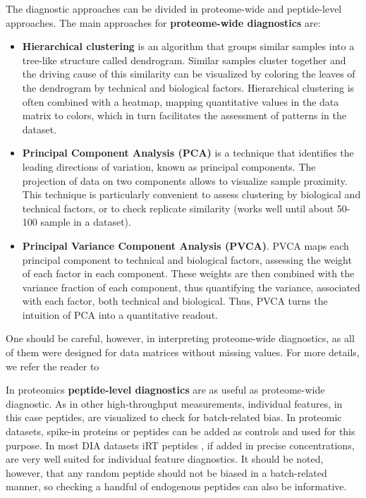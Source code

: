 \documentclass[num-refs]{wiley-article}
\begin{document}
The diagnostic approaches can be divided in proteome-wide and peptide-level approaches. The main approaches for \textbf{proteome-wide diagnostics} are:
\begin{itemize}
	\item \textbf{Hierarchical clustering} is an algorithm that groups similar samples into a tree-like structure called dendrogram. Similar samples cluster together and the driving cause of this similarity can be visualized by coloring the leaves of the dendrogram by technical and biological factors. Hierarchical clustering is often combined with a heatmap, mapping quantitative values in the data matrix to colors, which in turn facilitates the assessment of patterns in the dataset.
	\item \textbf{Principal Component Analysis (PCA)} is a technique that identifies the leading directions of variation, known as principal components. The projection of data on two components allows to visualize sample proximity. This technique is particularly convenient to assess clustering by biological and technical factors, or to check replicate similarity (works well until about 50-100 sample in a dataset). 
	\item \textbf{Principal Variance Component Analysis (PVCA)}. PVCA maps each principal component to technical and biological factors, assessing the weight of each factor in each component. These weights are then combined with the variance fraction of each component, thus quantifying the variance, associated with each factor, both technical and biological. Thus, PVCA turns the intuition of PCA into a quantitative readout. 
\end{itemize}

One should be careful, however, in interpreting proteome-wide diagnostics, as all of them were designed for data matrices without missing values. For more details, we refer the reader to %

In proteomics \textbf{peptide-level diagnostics} are as useful as proteome-wide diagnostic. As in other high-throughput measurements, individual features, in this case peptides, are visualized to check for batch-related bias. In proteomic datasets, spike-in proteins or peptides can be added as controls and used for this purpose. In most DIA datasets iRT peptides \cite{Escher:2012aa}, if added in precise concentrations, are very well suited for individual feature diagnostics.
It should be noted, however, that any random peptide should not be biased in a batch-related manner, so checking a handful of endogenous peptides can also be informative.
\end{document}

